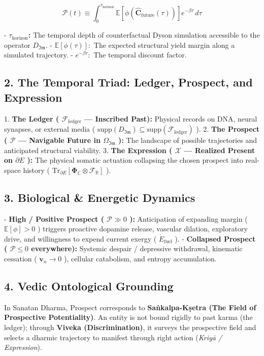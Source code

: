 \documentclass[11pt,a4paper]{article}
\theoremstyle{definition}
\theoremstyle{remark}
\begin{document}
\begin{equation}
\mathcal{P}(t) \equiv \int_0^{\tau_{\text{horizon}}} \mathbb{E}[ \phi\left( \hat{\mathbf{C}}_{\text{future}}(\tau) \right) ] e^{-\beta \tau} \, d\tau
\end{equation}


- \textbf{$\tau_{\text{horizon}}$:} The temporal depth of counterfactual Dyson simulation accessible to the operator $D_{\mathfrak{Im}}$.
- \textbf{$\mathbb{E}[\phi(\tau)]:$} The expected structural yield margin along a simulated trajectory.
- \textbf{$e^{-\beta \tau}:$} The temporal discount factor.

\subsection{2. The Temporal Triad: Ledger, Prospect, and Expression}
1. \textbf{The Ledger ( $\mathcal{F}_{\text{ledger}}$ — Inscribed Past):} Physical records on DNA, neural synapses, or external media ( $\mathrm{supp}(D_{\mathfrak{Im}}) \subseteq \mathrm{supp}(\mathcal{F}_{\text{ledger}})$ ).
2. \textbf{The Prospect ( $\mathcal{P}$ — Navigable Future in $\Omega_{\mathfrak{Im}}$ ):} The landscape of possible trajectories and anticipated structural viability.
3. \textbf{The Expression ( $\boldsymbol{\mathcal{X}}$ — Realized Present on $\partial E$ ):} The physical somatic actuation collapsing the chosen prospect into real-space history ( $\mathrm{Tr}_{\partial E}[\mathbf{\Phi}_{\mathbb{C}} \otimes \mathcal{F}_{\mathbb{R}}]$ ).

\subsection{3. Biological \& Energetic Dynamics}
- \textbf{High / Positive Prospect ( $\mathcal{P} \gg 0$ ):} Anticipation of expanding margin ( $\mathbb{E}[\phi] > 0$ ) triggers proactive dopamine release, vascular dilation, exploratory drive, and willingness to expend current exergy ( $\dot{E}_{\text{fuel}}$ ).
- \textbf{Collapsed Prospect ( $\mathcal{P} \le 0$ everywhere):} Systemic despair / depressive withdrawal, kinematic cessation ( $\mathbf{v}_n \to 0$ ), cellular catabolism, and entropy accumulation.

\subsection{4. Vedic Ontological Grounding}
In Sanatan Dharma, Prospect corresponds to \textbf{Saṅkalpa-Kṣetra (The Field of Prospective Potentiality)}. An entity is not bound rigidly to past karma (the ledger); through \textbf{Viveka (Discrimination)}, it surveys the prospective field and selects a dharmic trajectory to manifest through right action (\textit{Kriyā / Expression}).
\end{document}
